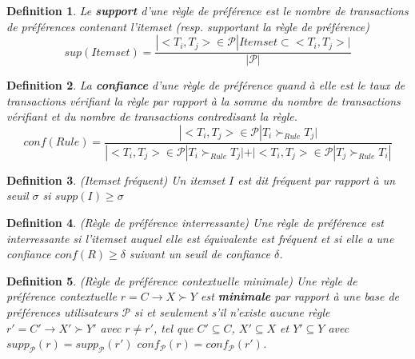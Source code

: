 \documentclass[a4paper,12pt,openany,oneside]{article}
\newtheorem{defn}{Definition} %
\begin{document}
    	\begin{defn}
    		Le \textbf{support} d'une règle de préférence est le nombre de transactions de préférences contenant l'itemset (resp. supportant la règle de préférence)\\
    		\[
    			sup(Itemset)=\frac{|<T_{i},T_{j}>\in \mathcal{P}|Itemset\subset <T_{i},T_{j}>|}{|\mathcal{P}|}
		\]
    		
    		
    	\end{defn}
    	\begin{defn}
    		La \textbf{confiance} d'une règle de préférence quand à elle est le taux de transactions vérifiant la règle par rapport à la somme du nombre de transactions vérifiant et du nombre de transactions contredisant la règle.
    		\[
    			conf(Rule)=\frac{|<T_{i},T_{j}>\in \mathcal{P}|T_{i}\succ_{Rule} T_{j}|}{|<T_{i},T_{j}>\in \mathcal{P}|T_{i}\succ_{Rule} T_{j}|+|<T_{i},T_{j}>\in \mathcal{P}| T_{j}\succ_{Rule} T_{i}|}
    		\]
    	\end{defn}
    	\begin{defn}(Itemset fréquent)
    		Un itemset $I$ est dit fréquent par rapport à un seuil $\sigma$ si $supp(I)\geq \sigma$
	\end{defn}
    	\begin{defn}(Règle de préférence interressante)
		Une règle de préférence est interressante si l'itemset auquel elle est équivalente est fréquent et si elle a une confiance $conf(R)\geq\delta$ suivant un seuil de confiance $\delta$.
	\end{defn}


    		

\begin{defn}(Règle de préférence contextuelle minimale)
Une règle de préférence contextuelle $r=C\rightarrow X\succ Y$ est \textbf{minimale} par rapport à une base de préférences utilisateurs $\mathcal{P}$ si et seulement s'il n'existe aucune règle $r'=C'\rightarrow X'\succ Y'$ avec $r\neq r'$, tel que $C'\subseteq C$, $X'\subseteq X$ et $Y'\subseteq Y$ avec $supp_\mathcal{P}(r)=supp_\mathcal{P}(r')$ $conf_\mathcal{P}(r)=conf_\mathcal{P}(r')$.
\end{defn}
\end{document}
